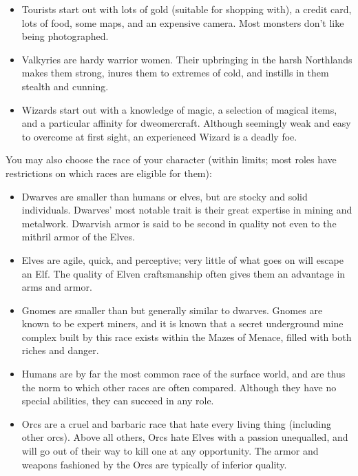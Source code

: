 \documentclass[11pt]{article}
\begin{document}
\begin{itemize}
\item Tourists start out with lots of gold (suitable for shopping with), a
credit card, lots of food, some maps, and an expensive camera.  Most
monsters don't like being photographed.

\item Valkyries are hardy warrior women.  Their upbringing in the harsh
Northlands makes them strong, inures them to extremes of cold, and
instills in them stealth and cunning.

\item Wizards start out with a knowledge of magic, a selection of magical
items, and a particular affinity for dweomercraft.  Although
seemingly weak and easy to overcome at first sight, an experienced
Wizard is a deadly foe.
\end{itemize}

You may also choose the race of your character (within limits; most
roles have restrictions on which races are eligible for them):

\begin{itemize}
\item Dwarves are smaller than humans or elves, but are stocky and solid
individuals.  Dwarves' most notable trait is their great expertise
in mining and metalwork.  Dwarvish armor is said to be second in
quality not even to the mithril armor of the Elves.

\item Elves are agile, quick, and perceptive; very little of what goes on
will escape an Elf.  The quality of Elven craftsmanship often gives
them an advantage in arms and armor.

\item Gnomes are smaller than but generally similar to dwarves.  Gnomes
are known to be expert miners, and it is known that a secret
underground mine complex built by this race exists within the Mazes
of Menace, filled with both riches and danger.

\item Humans are by far the most common race of the surface world, and are
thus the norm to which other races are often compared.  Although
they have no special abilities, they can succeed in any role.

\item Orcs are a cruel and barbaric race that hate every living thing
(including other orcs).  Above all others, Orcs hate Elves with a
passion unequalled, and will go out of their way to kill one at any
opportunity.  The armor and weapons fashioned by the Orcs are
typically of inferior quality.
\end{itemize}
\end{document}
